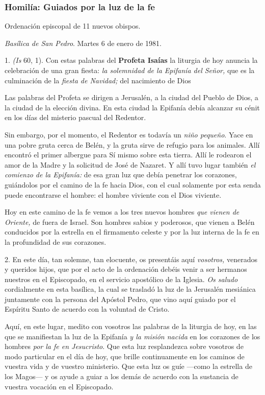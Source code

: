 \subsubsection{Homilía: Guiados por la luz de la fe}

Ordenación episcopal de 11 nuevos obispos.

\emph{Basílica de San Pedro}. Martes 6 de enero de 1981.

1.  \emph{(Is} 60, 1). Con estas palabras del \textbf{Profeta Isaías} la liturgia de hoy anuncia la celebración de una gran fiesta: \emph{la solemnidad de la Epifanía del Señor,} que es la culminación de la \emph{fiesta de Navidad;} del nacimiento de Dios

Las palabras del Profeta se dirigen a Jerusalén, a la ciudad del Pueblo de Dios, a la ciudad de la elección divina. En esta ciudad la Epifanía debía alcanzar su cénit en los días del misterio pascual del Redentor.

Sin embargo, por el momento, el Redentor es todavía un \emph{niño pequeño}. Yace en una pobre gruta cerca de Belén, y la gruta sirve de refugio para los animales. Allí encontró el primer albergue para Sí mismo sobre esta tierra. Allí le rodearon el amor de la Madre y la solicitud de José de Nazaret. Y allí tuvo lugar también \emph{el comienzo de la Epifanía:} de esa gran luz que debía penetrar los corazones, guiándolos por el camino de la fe hacia Dios, con el cual solamente por esta senda puede encontrarse el hombre: el hombre viviente con el Dios viviente.

Hoy en este camino de la fe vemos a los tres nuevos hombres \emph{que vienen de Oriente,} de fuera de Israel. Son hombres sabios y poderosos, que vienen a Belén conducidos por la estrella en el firmamento celeste y por la luz interna de la fe en la profundidad de sus corazones.

2. En este día, tan solemne, tan elocuente, os presentáis aquí \emph{vosotros,} venerados y queridos hijos, que por el acto de la ordenación debéis venir a ser hermanos nuestros en el Episcopado, en el servicio apostólico de la Iglesia. \emph{Os saludo} cordialmente en esta basílica, la cual se trasladó la luz de la Jerusalén mesiánica juntamente con la persona del Apóstol Pedro, que vino aquí guiado por el Espíritu Santo de acuerdo con la voluntad de Cristo.

Aquí, en este lugar, medito con vosotros las palabras de la liturgia de hoy, en las que se manifiestan la luz de la Epifanía \emph{y la misión nacida} en los corazones de los hombres \emph{por la fe en Jesucristo}. Que esta luz resplandezca sobre vosotros de modo particular en el día de hoy, que brille continuamente en los caminos de vuestra vida y de vuestro ministerio. Que esta luz os guíe ---como la estrella de los Magos--- y os ayude a guiar a los demás de acuerdo con la sustancia de vuestra vocación en el Episcopado.


